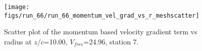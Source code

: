 \begin{figure}[H]
\centering
\texttt{[image: figs/run\_66/run\_66\_momentum\_vel\_grad\_vs\_r\_meshscatter]}
\caption{Scatter plot of the momentum based velocity gradient term vs radius at $z/c$=10.00, $V_{free}$=24.96, station 7.}
\label{fig:run_66_momentum_vel_grad_vs_r_meshscatter}
\end{figure}


